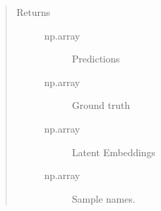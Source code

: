 \documentclass[letterpaper,10pt,english]{sphinxmanual}
\begin{document}
\begin{fulllineitems}
\begin{fulllineitems}
\begin{quote}
\begin{description}
\begin{description}
\end{description}

\item[{Returns}] \leavevmode\begin{description}
\item[{np.array}] \leavevmode
Predictions

\item[{np.array}] \leavevmode
Ground truth

\item[{np.array}] \leavevmode
Latent Embeddings

\item[{np.array}] \leavevmode
Sample names.

\end{description}

\end{description}\end{quote}

\end{fulllineitems}


\end{fulllineitems}

\end{document}
